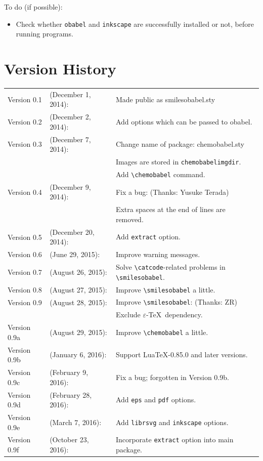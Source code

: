 \documentclass[dvipdfmx,12pt]{jsarticle}
\begin{document}
\clearpage

To do (if possible):
\begin{itemize}
\item Check whether \texttt{obabel} and \texttt{inkscape} are successfully
installed or not, before running programs.
\end{itemize}

\section{Version History}

\begin{table}[h]
\centering
\begin{tabular}{lll}
Version 0.1 & (December  1, 2014): & Made public as \textsf{smilesobabel.sty} \\
Version 0.2 & (December  2, 2014): & Add options which can be passed to obabel. \\
Version 0.3 & (December  7, 2014): & Change name of package: \textsf{chemobabel.sty} \\
            &                      & Images are stored in \texttt{chemobabelimgdir}. \\
            &                      & Add \verb|\chemobabel| command. \\
Version 0.4 & (December  9, 2014): & Fix a bug: (Thanks: Yusuke Terada) \\
            &                      & Extra spaces at the end of lines are removed. \\
Version 0.5 & (December 20, 2014): & Add \verb|extract| option. \\
Version 0.6 & (June     29, 2015): & Improve warning messages. \\
Version 0.7 & (August   26, 2015): & Solve \verb|\catcode|-related problems in \verb|\smilesobabel|. \\
Version 0.8 & (August   27, 2015): & Improve \verb|\smilesobabel| a little. \\
Version 0.9 & (August   28, 2015): & Improve \verb|\smilesobabel|: (Thanks: ZR) \\
            &                      & Exclude $\varepsilon$-\TeX\ dependency. \\
Version 0.9a & (August   29, 2015): & Improve \verb|\chemobabel| a little. \\
Version 0.9b & (January   6, 2016): & Support Lua\TeX-0.85.0 and later versions. \\
Version 0.9c & (February  9, 2016): & Fix a bug; forgotten in Version 0.9b. \\
Version 0.9d & (February 28, 2016): & Add \verb|eps| and \verb|pdf| options. \\
Version 0.9e & (March     7, 2016): & Add \verb|librsvg| and \verb|inkscape| options. \\
Version 0.9f & (October  23, 2016): & Incorporate \verb|extract| option into main package.
\end{tabular}
\end{table}
\end{document}
